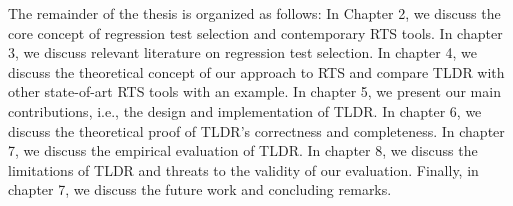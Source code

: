 The remainder of the thesis is organized as follows: In Chapter 2, we discuss the core concept of regression test selection and contemporary RTS tools. In chapter 3, we discuss relevant literature on regression test selection. In chapter 4, we discuss the theoretical concept of our approach to RTS and compare TLDR with other state-of-art RTS tools with an example. In chapter 5, we present our main contributions, i.e., the design and implementation of TLDR. In chapter 6, we discuss the theoretical proof of TLDR's correctness and completeness. In chapter 7, we discuss the empirical evaluation of TLDR. In chapter 8, we discuss the limitations of TLDR and threats to the validity of our evaluation. Finally, in chapter 7, we discuss the future work and concluding remarks.

